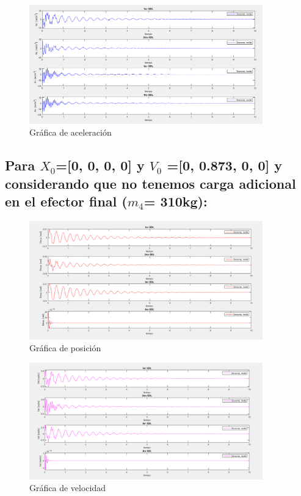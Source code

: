 \documentclass{aleph-revista}
\begin{document}
\begin{figure}[H]
    \centering
    \includegraphics[width=0.90\textwidth]{Imagenes/r3.png}
    \caption{Gráfica de aceleración}
    \label{fig:etiqueta de la figura}
\end{figure}


\subsection{Para $X_0$=[0, 0, 0, 0] y $V_0$ =[0, 0.873, 0, 0] y considerando que no tenemos carga adicional en el efector final ($m_4$= 310kg):}
\begin{figure}[H]
    \centering
    \includegraphics[width=0.90\textwidth]{Imagenes/r4.png}
    \caption{Gráfica de posición}
    \label{fig:etiqueta de la figura}
\end{figure}

\begin{figure}[H]
    \centering
    \includegraphics[width=0.90\textwidth]{Imagenes/r5.png}
    \caption{Gráfica de velocidad}
    \label{fig:etiqueta de la figura}
\end{figure}
\end{document}
